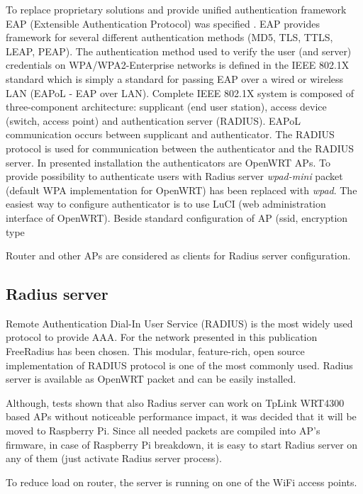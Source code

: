 \documentclass{llncs}
\begin{document}
To replace proprietary solutions and provide unified authentication framework EAP (Extensible Authentication Protocol) was specified \cite{rfc3748}. EAP provides framework for several different authentication methods (MD5, TLS, TTLS, LEAP, PEAP). The authentication method used to verify the user (and server) credentials on WPA/WPA2-Enterprise networks is defined in the IEEE 802.1X standard which is simply a standard for passing EAP over a wired or wireless LAN (EAPoL - EAP over LAN). Complete IEEE 802.1X system is composed of three-component architecture: supplicant (end user station), access device (switch, access point) and authentication server (RADIUS).  EAPoL communication occurs between supplicant and authenticator. The RADIUS protocol is used for communication between the authenticator and the RADIUS server. In presented installation the authenticators are OpenWRT APs. To provide possibility to authenticate users with Radius server \textit{wpad-mini} packet (default WPA implementation for OpenWRT) has been replaced with \textit{wpad}. The easiest way to configure authenticator is to use LuCI (web administration interface of OpenWRT). Beside standard configuration of AP (ssid, encryption type 


Router and other APs are considered as clients for Radius server configuration. 


\subsection{Radius server}

Remote Authentication Dial-In User Service (RADIUS) \cite{rfc2865} is the most widely used protocol to provide AAA. For the network presented in this publication FreeRadius \cite{freeRadius} has been chosen. This modular, feature-rich, open source implementation of RADIUS protocol is one of the most commonly used. Radius server is available as OpenWRT packet and can be easily installed. 




Although, tests shown that also Radius server can work on TpLink WRT4300 based APs without noticeable performance impact, it was decided that it will be moved to Raspberry Pi. Since all needed packets are compiled into AP's firmware, in case of Raspberry Pi breakdown, it is easy to start Radius server on any of them (just activate Radius server process). 





To reduce load on router, the server is running on one of the WiFi access points. 
\end{document}
